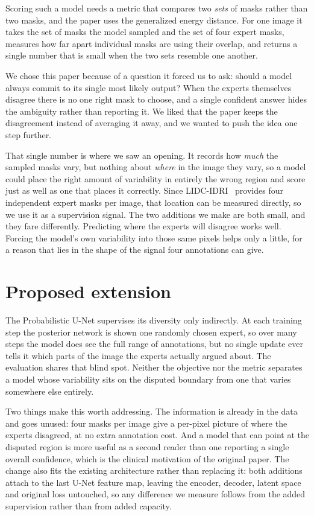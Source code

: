 \documentclass[10pt]{article}
\begin{document}
Scoring such a model needs a metric that compares two \emph{sets} of masks rather
than two masks, and the paper uses the generalized energy distance. For one
image it takes the set of masks the model sampled and the set of four expert
masks, measures how far apart individual masks are using their overlap, and
returns a single number that is small when the two sets resemble one another.

We chose this paper because of a question it forced us to ask: should a model
always commit to its single most likely output? When the experts themselves
disagree there is no one right mask to choose, and a single confident answer
hides the ambiguity rather than reporting it. We liked that the paper keeps the
disagreement instead of averaging it away, and we wanted to push the idea one
step further.

That single number is where we saw an opening. It records how \emph{much} the
sampled masks vary, but nothing about \emph{where} in the image they vary, so a
model could place the right amount of variability in entirely the wrong region
and score just as well as one that places it correctly. Since LIDC-IDRI~\cite{lidc} provides four independent
expert masks per image, that location can be measured directly, so we use it as a
supervision signal. The two additions we make are both small, and they fare
differently. Predicting where the experts will disagree works well. Forcing the
model's own variability into those same pixels helps only a little, for a reason
that lies in the shape of the signal four annotations can give.

\section{Proposed extension}\label{sec:ext}

The Probabilistic U-Net supervises its diversity only indirectly. At each
training step the posterior network is shown one randomly chosen expert, so over
many steps the model does see the full range of annotations, but no single update
ever tells it which parts of the image the experts actually argued about. The
evaluation shares that blind spot. Neither the objective nor the metric separates a model
whose variability sits on the disputed boundary from one that varies somewhere
else entirely.

Two things make this worth addressing. The information is already in the data and
goes unused: four masks per image give a per-pixel picture of where the experts
disagreed, at no extra annotation cost. And a model that can point at the
disputed region is more useful as a second reader than one reporting a single
overall confidence, which is the clinical motivation of the original paper. The
change also fits the existing architecture rather than replacing it: both
additions attach to the last U-Net feature map, leaving the encoder, decoder,
latent space and original loss untouched, so any difference we measure follows
from the added supervision rather than from added capacity.
\end{document}
